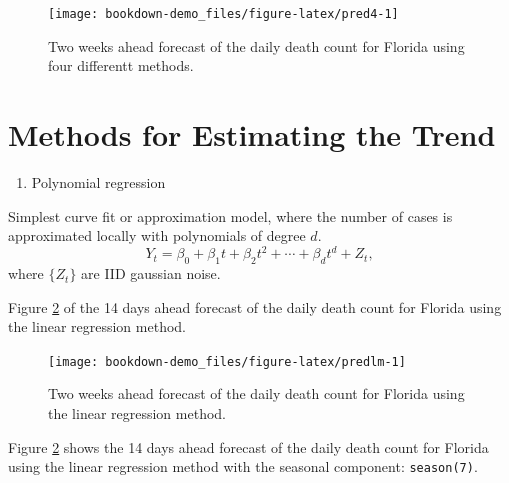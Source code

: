 \documentclass[]{book}
\newenvironment{Shaded}{\begin{snugshade}}{\end{snugshade}}
\newcommand{\KeywordTok}[1]{\textcolor[rgb]{0.13,0.29,0.53}{\textbf{#1}}}
\newcommand{\StringTok}[1]{\textcolor[rgb]{0.31,0.60,0.02}{#1}}
\newcommand{\OperatorTok}[1]{\textcolor[rgb]{0.81,0.36,0.00}{\textbf{#1}}}
\newcommand{\NormalTok}[1]{#1}
\providecommand{\tightlist}{%
  \setlength{\itemsep}{0pt}\setlength{\parskip}{0pt}}
\begin{document}
\begin{figure}

{\centering \texttt{[image: bookdown-demo\_files/figure-latex/pred4-1]} 

}

\caption{Two weeks ahead forecast of the daily death count for Florida using four differentt methods.}\label{fig:pred4}
\end{figure}

\section{Methods for Estimating the
Trend}\label{methods-for-estimating-the-trend}

\begin{enumerate}
\def\labelenumi{\arabic{enumi}.}
\tightlist
\item
  Polynomial regression
\end{enumerate}

Simplest curve fit or approximation model, where the number of cases is
approximated locally with polynomials of degree \(d\). \[
Y_t = \beta_0 + \beta_1 t + \beta_2 t^2 + \cdots + \beta_d t^d + Z_t,
\] where \(\{Z_t\}\) are IID gaussian noise.

Figure \ref{fig:predlm} of the 14 days ahead forecast of the daily death
count for Florida using the linear regression method.

\begin{Shaded}
\end{Shaded}

\begin{figure}

{\centering \texttt{[image: bookdown-demo\_files/figure-latex/predlm-1]} 

}

\caption{Two weeks ahead forecast of the daily death count for Florida using the linear regression method.}\label{fig:predlm}
\end{figure}

Figure \ref{fig:predlm} shows the 14 days ahead forecast of the daily
death count for Florida using the linear regression method with the
seasonal component: \texttt{season(7)}.
\end{document}
